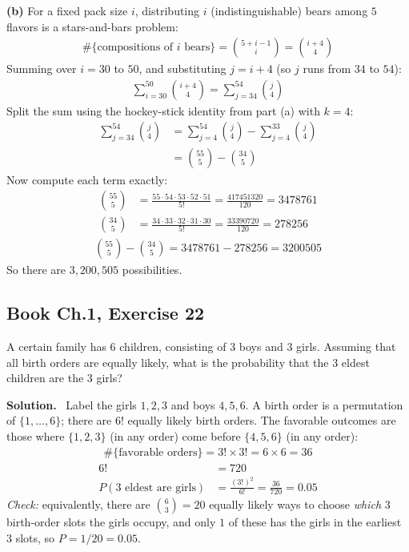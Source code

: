 \documentclass[11pt]{article}
\newcommand{\Sol}{\vspace{2pt}\noindent\textbf{Solution.}\ }
\begin{document}
\textbf{(b)} For a fixed pack size $i$, distributing $i$ (indistinguishable) bears among $5$ flavors is a stars-and-bars problem:
\begin{align*}
\#\{\text{compositions of }i\text{ bears}\} = \binom{5+i-1}{i} = \binom{i+4}{4}
\end{align*}
Summing over $i=30$ to $50$, and substituting $j=i+4$ (so $j$ runs from $34$ to $54$):
\begin{align*}
\sum_{i=30}^{50}\binom{i+4}{4} = \sum_{j=34}^{54}\binom{j}{4}
\end{align*}
Split the sum using the hockey-stick identity from part (a) with $k=4$:
\begin{align*}
\sum_{j=34}^{54}\binom{j}{4} &= \sum_{j=4}^{54}\binom{j}{4} - \sum_{j=4}^{33}\binom{j}{4}\\
&= \binom{55}{5} - \binom{34}{5}
\end{align*}
Now compute each term exactly:
\begin{align*}
\binom{55}{5} &= \frac{55\cdot 54\cdot 53\cdot 52\cdot 51}{5!} = \frac{417451320}{120} = 3478761\\
\binom{34}{5} &= \frac{34\cdot 33\cdot 32\cdot 31\cdot 30}{5!} = \frac{33390720}{120} = 278256
\end{align*}
\begin{align*}
\binom{55}{5}-\binom{34}{5} = 3478761 - 278256 = 3200505
\end{align*}
So there are $\boxed{3{,}200{,}505}$ possibilities.

\subsection{Book Ch.1, Exercise 22}
\begin{qbox}
A certain family has 6 children, consisting of 3 boys and 3 girls. Assuming that all birth orders are equally likely, what is the probability that the 3 eldest children are the 3 girls?
\end{qbox}
\Sol
Label the girls $1,2,3$ and boys $4,5,6$. A birth order is a permutation of $\{1,\dots,6\}$; there are $6!$ equally likely birth orders. The favorable outcomes are those where $\{1,2,3\}$ (in any order) come before $\{4,5,6\}$ (in any order):
\begin{align*}
\#\{\text{favorable orders}\} = 3! \times 3! = 6\times 6 = 36
\end{align*}
\begin{align*}
6! &= 720\\
P(\text{3 eldest are girls}) &= \frac{(3!)^2}{6!} = \frac{36}{720} = 0.05
\end{align*}
\emph{Check:} equivalently, there are $\binom{6}{3}=20$ equally likely ways to choose \emph{which} 3 birth-order slots the girls occupy, and only $1$ of these has the girls in the earliest $3$ slots, so $P=1/20=0.05$. \checkmark
\end{document}
